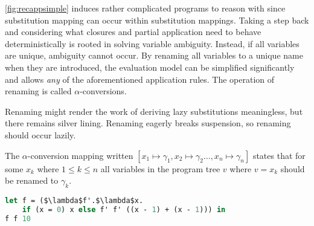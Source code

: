 \documentclass[11pt,oneside,a4paper]{report}
\begin{document}
\autoref{fig:recappsimple} induces rather complicated programs to reason with since substitution mapping can occur within substitution mappings.
Taking a step back and considering what closures and partial application need to behave deterministically is rooted in solving variable ambiguity.
Instead, if all variables are unique, ambiguity cannot occur.
By renaming all variables to a unique name when they are introduced, the evaluation model can be simplified significantly and allows \textit{any} of the aforementioned application rules.
The operation of renaming is called $\alpha$-conversions.
\begin{remark}
  Renaming might render the work of deriving lazy substitutions meaningless, but there remains silver lining.
  Renaming eagerly breaks suspension, so renaming should occur lazily.
\end{remark}
The $\alpha$-conversion mapping written $[x_1 \mapsto \gamma_1, x_2 \mapsto \gamma_2 \dots , x_n \mapsto \gamma_n]$ states that for some $x_k$ where $1 \leq k \leq n$ all variables in the program tree $v$ where $v = x_k$ should be renamed to $\gamma_k$.
\begin{lstlisting}[language=ML,caption={Recursive addition function},label={lst:recalpha},mathescape=true]
let f = ($\lambda$f'.$\lambda$x.
    if (x = 0) x else f' f' ((x - 1) + (x - 1))) in
f f 10
\end{lstlisting}
\end{document}

